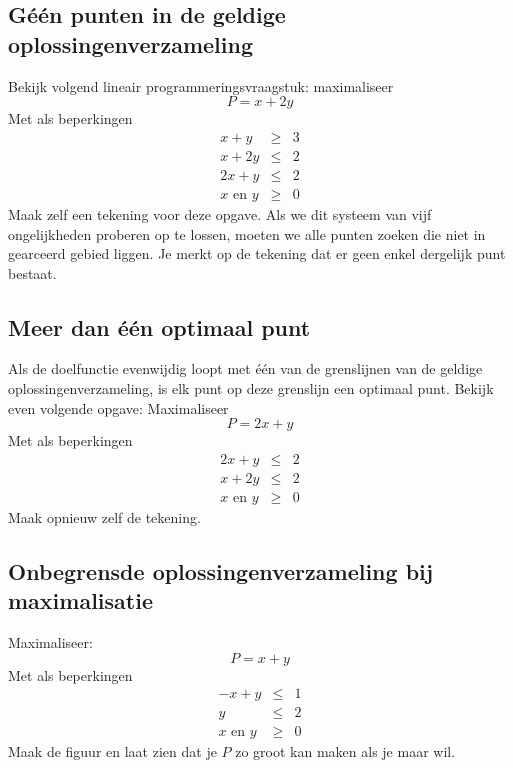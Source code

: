 \subsection{G\'{e}\'{e}n punten in de geldige oplossingenverzameling}
Bekijk volgend lineair programmeringsvraagstuk: maximaliseer
\begin{displaymath}
    P=x+2y
\end{displaymath}
Met als beperkingen
\begin{eqnarray*}
    x+y & \geqslant & 3  \\
    x+2y & \leqslant & 2  \\
    2x+y & \leqslant & 2  \\
    x \mbox{ en } y & \geqslant & 0
\end{eqnarray*}
Maak zelf een tekening voor deze opgave. Als we dit systeem van vijf ongelijkheden proberen op te lossen,
moeten we alle punten zoeken die niet in gearceerd gebied liggen. Je
merkt op de tekening dat er geen enkel dergelijk punt bestaat.



\subsection{Meer dan \'{e}\'{e}n optimaal punt}
Als de doelfunctie evenwijdig loopt met \'{e}\'{e}n van de grenslijnen
van de geldige oplossingenverzameling, is elk punt op deze grenslijn
een optimaal punt. Bekijk even volgende opgave:
Maximaliseer
\begin{displaymath}
    P=2x+y
\end{displaymath}
Met als beperkingen
\begin{eqnarray*}
    2x+y & \leqslant & 2  \\
    x+2y & \leqslant & 2  \\
    x \mbox{ en }y & \geqslant & 0
\end{eqnarray*}
Maak opnieuw zelf de tekening.



\subsection{Onbegrensde oplossingenverzameling bij maximalisatie}
Maximaliseer:
\begin{displaymath}
    P=x+y
\end{displaymath}
Met als beperkingen
\begin{eqnarray*}
    -x+y & \leqslant & 1  \\
    y & \leqslant & 2  \\
    x \mbox{ en } y & \geqslant & 0
\end{eqnarray*}
Maak de figuur en laat zien dat je $P$ zo groot kan maken als je maar wil.



